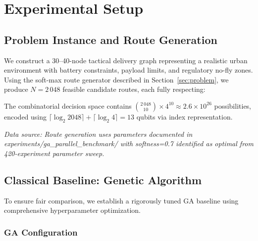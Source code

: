 \section{Experimental Setup}
\label{sec:experiments}

\subsection{Problem Instance and Route Generation}

We construct a 30--40-node tactical delivery graph representing a realistic urban environment with battery constraints, payload limits, and regulatory no-fly zones.
Using the soft-max route generator described in Section~\ref{sec:problem}, we produce $N = 2\,048$ feasible candidate routes, each fully respecting:

The combinatorial decision space contains ${2\,048 \choose 10} \times 4^{10} \approx 2.6 \times 10^{26}$ possibilities, encoded using $\lceil\log_2 2048\rceil + \lceil\log_2 4\rceil = 13$ qubits via index representation.

\textit{Data source: Route generation uses parameters documented in experiments/ga\_parallel\_benchmark/ with softness=0.7 identified as optimal from 420-experiment parameter sweep.}

\subsection{Classical Baseline: Genetic Algorithm}

To ensure fair comparison, we establish a rigorously tuned GA baseline using comprehensive hyperparameter optimization.

\subsubsection{GA Configuration}

